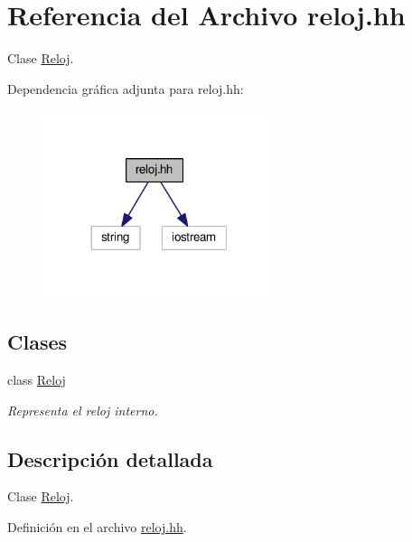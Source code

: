 \hypertarget{reloj_8hh}{\section{Referencia del Archivo reloj.\-hh}
\label{reloj_8hh}
}


Clase \hyperlink{class_reloj}{Reloj}.  


Dependencia gráfica adjunta para reloj.\-hh\-:\nopagebreak
\begin{figure}[H]
\begin{center}
\leavevmode
\includegraphics[width=191pt]{reloj_8hh__incl}
\end{center}
\end{figure}
\subsection*{Clases}
\begin{DoxyCompactItemize}
\item 
class \hyperlink{class_reloj}{Reloj}
\begin{DoxyCompactList}\small\item\em Representa el reloj interno. \end{DoxyCompactList}\end{DoxyCompactItemize}


\subsection{Descripción detallada}
Clase \hyperlink{class_reloj}{Reloj}. 

Definición en el archivo \hyperlink{reloj_8hh_source}{reloj.\-hh}.

